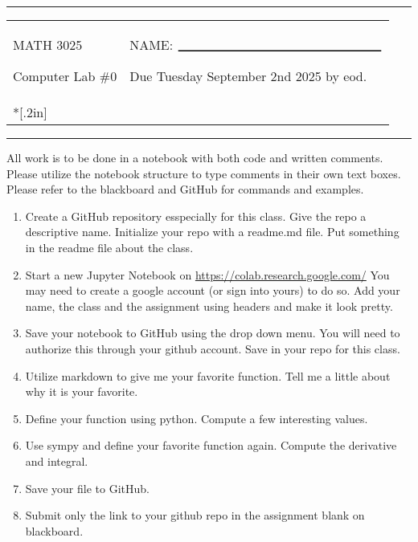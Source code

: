 \documentclass[11pt]{article}
\begin{document}
\newcommand{\dsp}{\displaystyle}
\newcommand{\ihat}{{\bf{i}}}
\newcommand{\jhat}{{\bf{j}}}
\newcommand{\khat}{{\bf{k}}}
\newcommand{\Fhat}{{\bf{F}}}

\thispagestyle{empty}

\noindent
\sffamily
\begin{center}
\rule{7.5in}{2pt}

\vspace{.2in}

\begin{tabular}{p{4in}p{3.5in}}
MATH 3025

\vspace{.2in}

Computer Lab \#0
& 
NAME:  $_{\rule{2.5in}{1pt}}$

\vspace{.2in}

Due Tuesday September 2nd 2025 by eod.
\\*[.2in]
\end{tabular}
\rule{7.5in}{2pt}

\vspace{.1in}
All work is to be done in a notebook with both code and written comments.  Please utilize the notebook structure to type comments in their own text boxes. \\
 Please refer to the blackboard and GitHub for commands and examples. 
\end{center}

\begin{enumerate}
\item Create a GitHub repository esspecially for this class.  Give the repo a descriptive name.  Initialize your repo with a readme.md file.  Put something in the readme file about the class.
\item Start a new Jupyter Notebook on \url{https://colab.research.google.com/}  You may need to create a google account (or sign into yours) to do so.  Add your name, the class and the assignment using headers and make it look pretty.
\item Save your notebook to GitHub using the drop down menu.  You will need to authorize this through your github account.  Save in your repo for this class.
\item Utilize markdown to give me your favorite function.  Tell me a little about why it is your favorite.
\item Define your function using python.  Compute a few interesting values.
\item Use sympy and define your favorite function again.  Compute the derivative and integral.
\item Save your file to GitHub.
\item Submit only the link to your github repo in the assignment blank on blackboard. 
\end{enumerate}
\end{document}
